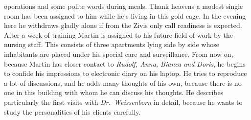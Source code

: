 operations and some polite words during meals. 
Thank heavens a modest single room has been assigned to him while he's living in 
this gold cage. 
In the evening here he withdraws gladly alone if from the Zivis only call readiness 
is expected. \\ 
\[\] 
After a week of training Martin is assigned to his future field of work by the 
nursing staff. 
This consists of three apartments lying side by side whose inhabitants are placed 
under his special care and surveillance.
From now on, because Martin has closer contact to {\em Rudolf, Anna, Bianca and 
Doris\/}, he begins to confide his impressions to electronic diary on his laptop. 
He tries to reproduce a lot of discussions, and he adds many thoughts of his own, 
because there is no one in this building with whom he can discuss his thoughts. 
He describes particularly the first visits with {\em Dr.~Weissenborn\/} 
in detail, because he wants to study the personalities of his clients carefully.


